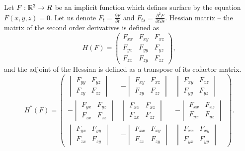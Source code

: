 Let $F:\R^3 \to R$ be an implicit function which defines surface by the equation $F(x, y, z) = 0$. 
Let us denote $F_t = \frac{\partial F}{\partial t}$ and $F_{ts} = \frac{\partial^2 F}{\partial t \partial s}$.
Hessian matrix -- the matrix of the second order derivatives is defined as 
$$
H(F) = 
\begin{pmatrix}
    F_{xx} & F_{xy} & F_{xz} \\
    F_{yx} & F_{yy} & F_{yz} \\
    F_{zx} & F_{zy} & F_{zz}
\end{pmatrix},
$$
and the adjoint of the Hessian is defined as a transpose of its cofactor matrix.
$$
H^*(F) = 
\begin{pmatrix}
    \begin{vmatrix} F_{yy} & F_{yz} \\ F_{zy} & F_{zz} \end{vmatrix} & 
    -\begin{vmatrix} F_{xy} & F_{xz} \\ F_{zy} & F_{zz} \end{vmatrix} &
    \begin{vmatrix} F_{xy} & F_{xz} \\ F_{yy} & F_{yz} \end{vmatrix} \\

    -\begin{vmatrix} F_{yx} & F_{yz} \\ F_{zx} & F_{zz} \end{vmatrix} &
    \begin{vmatrix} F_{xx} & F_{xz} \\ F_{zx} & F_{zz} \end{vmatrix} & 
    -\begin{vmatrix} F_{xx} & F_{xz} \\ F_{yx} & F_{yz} \end{vmatrix} \\

    \begin{vmatrix} F_{yx} & F_{yy} \\ F_{zx} & F_{zy} \end{vmatrix} & 
    -\begin{vmatrix} F_{xx} & F_{xy} \\ F_{zx} & F_{zy} \end{vmatrix} & 
    \begin{vmatrix} F_{xx} & F_{xy} \\ F_{yx} & F_{yy} \end{vmatrix}
\end{pmatrix}.
$$

